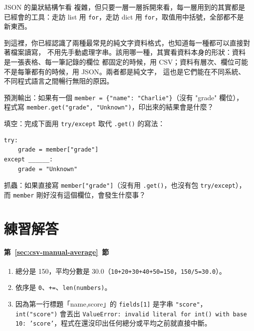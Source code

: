 JSON 的巢狀結構乍看
複雜，但只要一層一層拆開來看，每一層用到的其實都是已經會的工具：走訪 list 用
\texttt{for}，走訪 dict 用 \texttt{for}，取值用中括號，全部都不是新東西。

到這裡，你已經認識了兩種最常見的純文字資料格式，也知道每一種都可以直接對著檔案讀寫，
不用先手動處理字串。該用哪一種，其實看資料本身的形狀：資料是一張表格、每一筆記錄的欄位
都固定的時候，用 CSV；資料有層次、欄位可能不是每筆都有的時候，用 JSON。兩者都是純文字，
這也是它們能在不同系統、不同程式語言之間暢行無阻的原因。

\begin{drills}[label=drills:json-nested]
\item 預測輸出：如果有一個 \texttt{member = \{"name": "Charlie"\}}（沒有 "grade" 欄位），
程式寫 \texttt{member.get("grade", "Unknown")}，印出來的結果會是什麼？
\item 填空：完成下面用 \texttt{try/except} 取代 \texttt{.get()} 的寫法：
\begin{verbatim}
try:
    grade = member["grade"]
except ______:
    grade = "Unknown"
\end{verbatim}
\item 抓蟲：如果直接寫 \texttt{member["grade"]}（沒有用 \texttt{.get()}，也沒有包
\texttt{try/except}），而 \texttt{member} 剛好沒有這個欄位，會發生什麼事？
\end{drills}

\section*{練習解答}

\paragraph{第~\ref{sec:csv-manual-average}~節}
\begin{enumerate}
\item 總分是 150，平均分數是 30.0（\texttt{10+20+30+40+50=150}，\texttt{150/5=30.0}）。
\item 依序是 \texttt{0}、\texttt{+=}、\texttt{len(numbers)}。
\item 因為第一行標題「name,score」的 \texttt{fields[1]} 是字串 \texttt{"score"}，
\texttt{int("score")} 會丟出 \texttt{ValueError: invalid literal for int() with base
10: 'score'}，程式在還沒印出任何總分或平均之前就直接中斷。
\end{enumerate}

